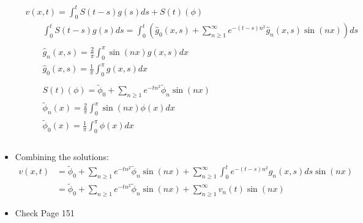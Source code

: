 \documentclass[12pt, a4paper]{article}
\begin{document}
\begin{itemize}
\begin{align*}
        &v(x, t) =  \int_0^tS(t-s)g(s)ds + S(t)(\phi)\\
        &\qquad\int_0^tS(t-s)g(s)ds= \int_0^t\left(\hat{g}_0(x, s)+\sum_{n\geq 1}^\infty e^{-(t-s)n^2}\hat{g}_n(x, s)\sin(nx)\right)ds\\\\
        &\qquad \hat{g}_n(x, s) = \frac{2}{\pi} \int_0^\pi \sin(nx)g(x, s)dx\\
        &\qquad \hat{g}_0(x, s) = \frac{1}{\pi} \int_0^\pi g(x, s)dx\\\\
        &\qquad S(t)(\phi) = \tilde{\phi}_0 + \sum_{n\geq 1}e^{-tn^2}\tilde{\phi}_n\sin(nx)\\
        &\qquad \tilde{\phi}_n(x) = \frac{2}{\pi} \int_0^\pi \sin(nx)\phi(x)dx\\
        &\qquad \tilde{\phi}_0(x) = \frac{1}{\pi} \int_0^\pi \phi(x)dx\\\\
    \end{align*}
    \item Combining the solutions:
    \begin{align*}
        v(x, t) &=  \tilde{\phi}_0 + \sum_{n\geq 1}e^{-tn^2}\tilde{\phi}_n\sin(nx) + \sum_{n\geq 1}^{\infty}\int_0^te^{-(t-s)n^2}\hat{g}_n(x, s)ds\sin(nx)\\
        &= \tilde{\phi}_0 + \sum_{n\geq 1}e^{-tn^2}\tilde{\phi}_n\sin(nx) + \sum_{n\geq 1}^{\infty}v_n(t)\sin(nx)
    \end{align*}
    \item Check Page 151
\end{itemize}
\vspace{0.3em}
\end{document}
